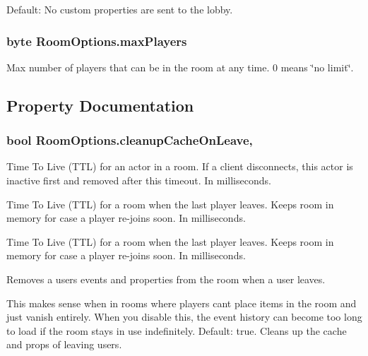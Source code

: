 Default\+: No custom properties are sent to the lobby. 
\subsubsection[{\texorpdfstring{max\+Players}{maxPlayers}}]{\setlength{\rightskip}{0pt plus 5cm}byte Room\+Options.\+max\+Players}\hypertarget{class_room_options_aa6e8ee62ea58621a6ac3dc33deb319ba}{}\label{class_room_options_aa6e8ee62ea58621a6ac3dc33deb319ba}


Max number of players that can be in the room at any time. 0 means \char`\"{}no limit\char`\"{}.



\subsection{Property Documentation}
\subsubsection[{\texorpdfstring{cleanup\+Cache\+On\+Leave}{cleanupCacheOnLeave}}]{\setlength{\rightskip}{0pt plus 5cm}bool Room\+Options.\+cleanup\+Cache\+On\+Leave\hspace{0.3cm}{\ttfamily [get]}, {\ttfamily [set]}}\hypertarget{class_room_options_a30d0b25a8b85c9232a8a9140bc7def4b}{}\label{class_room_options_a30d0b25a8b85c9232a8a9140bc7def4b}


Time To Live (T\+TL) for an \textquotesingle{}actor\textquotesingle{} in a room. If a client disconnects, this actor is inactive first and removed after this timeout. In milliseconds.

Time To Live (T\+TL) for a room when the last player leaves. Keeps room in memory for case a player re-\/joins soon. In milliseconds.

Time To Live (T\+TL) for a room when the last player leaves. Keeps room in memory for case a player re-\/joins soon. In milliseconds.

Removes a user\textquotesingle{}s events and properties from the room when a user leaves.

This makes sense when in rooms where players can\textquotesingle{}t place items in the room and just vanish entirely. When you disable this, the event history can become too long to load if the room stays in use indefinitely. Default\+: true. Cleans up the cache and props of leaving users. 
